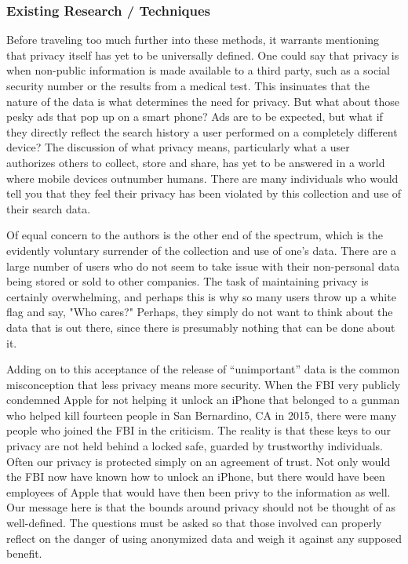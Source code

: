 \documentclass[10pt,journal,compsoc]{IEEEtran}
\begin{document}
\subsubsection{Existing Research / Techniques}

	Before traveling too much further into these methods, it warrants mentioning that privacy itself has yet to be universally defined. One could say that privacy is when non-public information is made available to a third party, such as a social security number or the results from a medical test.  This insinuates that the nature of the data is what determines the need for privacy.  But what about those pesky ads that pop up on a smart phone?  Ads are to be expected, but what if they directly reflect the search history a user performed on a completely different device?  The discussion of what privacy means, particularly what a user authorizes others to collect, store and share, has yet to be answered in a world where mobile devices outnumber humans\cite{borne}. There are many individuals who would tell you that they feel their privacy has been violated by this collection and use of their search data.
	
	Of equal concern to the authors is the other end of the spectrum, which is the evidently voluntary surrender of the collection and use of one's data.  There are a large number of users who do not seem to take issue with their non-personal data being stored or sold to other companies.  The task of maintaining privacy is certainly overwhelming, and perhaps this is why so many users throw up a white flag and say, "Who cares?"  Perhaps, they simply do not want to think about the data that is out there, since there is presumably nothing that can be done about it.
	
	Adding on to this acceptance of the release of “unimportant” data is the common misconception that less privacy means more security.  When the FBI very publicly condemned Apple for not helping it unlock an iPhone that belonged to a gunman who helped kill fourteen people in San Bernardino, CA in 2015, there were many people who joined the FBI in the criticism.  The reality is that these keys to our privacy are not held behind a locked safe, guarded by trustworthy individuals.  Often our privacy is protected simply on an agreement of trust.  Not only would the FBI now have known how to unlock an iPhone, but there would have been employees of Apple that would have then been privy to the information as well.  Our message here is that the bounds around privacy should not be thought of as well-defined.  The questions must be asked so that those involved can properly reflect on the danger of using anonymized data and weigh it against any supposed benefit.
	
\end{document}
